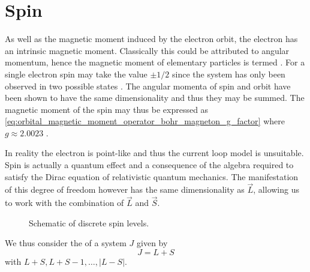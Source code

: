 \section{Spin}
As well as the magnetic moment induced by the electron orbit, the electron has an intrinsic magnetic moment. Classically this could be attributed to angular momentum, hence the magnetic moment of elementary particles is termed . 
For a single electron spin may take the value $\pm 1/2$ since the system has only been observed in two possible states \cite{Gerlach1922}. The angular momenta of spin and orbit have been shown to have the same dimensionality and thus they may be summed. 
The magnetic moment of the spin may thus be expressed as \eqref{eq:orbital_magnetic_moment_operator_bohr_magneton_g_factor} \cite{Povh2002-fj} where $g\approx2.0023$ \cite{electron-g-factor, PhysRevLett.130.071801}. 

%         
%
In reality the electron is point-like and thus the current loop model is unsuitable. Spin is actually a quantum effect and a consequence of the algebra required to satisfy the Dirac equation of relativistic quantum mechanics. The manifestation of this degree of freedom however has the same dimensionality as $\vec{L}$, allowing us to work with the combination of $\vec{L}$ and $\vec{S}$. 

\begin{wrapfigure}{r}{0.3\textwidth}%
    \begin{center}
        
  \caption{Schematic of discrete spin levels.}%
\end{center}
\end{wrapfigure}


We thus consider the  of a system $J$ given by 
\begin{equation}
    J = L + S 
    \label{eq:total_angular_momentum}
\end{equation}
with $L+S, L+ S - 1, \dots, |L-S|$. 

